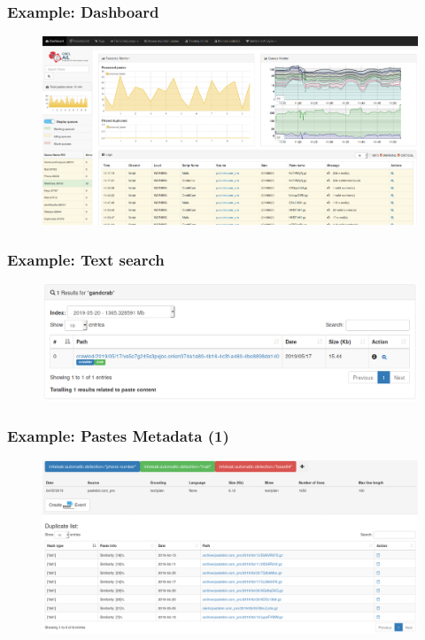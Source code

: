 \begin{frame}
    \frametitle{Example: Dashboard}
    \begin{figure}
        \includegraphics[scale=0.18, angle=0]{screenshot/dashboard.png}
    \end{figure}
\end{frame}


\begin{frame}
    \frametitle{Example: Text search}
    \begin{figure}
        \includegraphics[scale=0.3, angle=0]{images/ail_02.png}
    \end{figure}
\end{frame}

\begin{frame}
    \frametitle{Example: Pastes Metadata (1)}
    \begin{figure}
        \includegraphics[scale=0.21, angle=0]{images/ail_15.png}
    \end{figure}
\end{frame}

